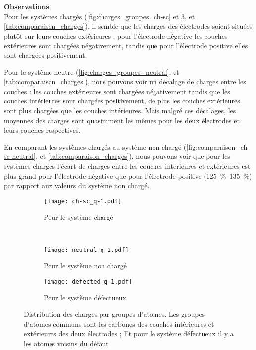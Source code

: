 \textbf{Observations}\\
Pour les systèmes chargés (\autoref{fig:charges_groupes_ch-sc} et \ref{fig:charges_groupes_defected}, et \autoref{tab:comparaison_charges}), il semble que les charges des électrodes soient situées plutôt sur leurs couches extérieures : pour l'électrode négative les couches extérieures sont chargées négativement, tandis que pour l'électrode positive elles sont chargées positivement.

Pour le système neutre (\autoref{fig:charges_groupes_neutral}, et \autoref{tab:comparaison_charges}), nous pouvons voir un décalage de charges entre les couches : les couches extérieures sont chargées négativement tandis que les couches intérieures sont chargées positivement, de plus les couches extérieures sont plus chargées que les couches intérieures. Mais malgré ces décalages, les moyennes des charges sont quasimment les mêmes pour les deux électrodes et leurs couches respectives.

En comparant les systèmes chargés au système non chargé (\autoref{fig:comparaison_ch-sc-neutral}, et \autoref{tab:comparaison_charges}), nous pouvons voir que pour les systèmes chargés l'écart de charges entre les couches intérieures et extérieures est plus grand pour l'électrode négative que pour l'électrode positive (\qtyrange[range-units = single]{125}{135}{\percent}) par rapport aux valeurs du système non chargé.

\begin{figure}[h!]
    \centering
    \begin{subfigure}{.49 \textwidth}
        \centering
        \texttt{[image: ch-sc\_q-1.pdf]}
        \caption{Pour le système chargé}
        \label{fig:charges_groupes_ch-sc}
    \end{subfigure}%
    ~
    \begin{subfigure}{.49 \textwidth}
        \centering
        \texttt{[image: neutral\_q-1.pdf]}
        \caption{Pour le système non chargé}
        \label{fig:charges_groupes_neutral}
    \end{subfigure}
    
    \begin{subfigure}{.49 \textwidth}
        \centering
        \texttt{[image: defected\_q-1.pdf]}
        \caption{Pour le système défectueux}
        \label{fig:charges_groupes_defected}
    \end{subfigure}

    \caption{Distribution des charges par groupes d'atomes. Les groupes d'atomes communs sont les carbones des couches intérieures et extérieures des deux électrodes ; Et pour le système défectueux il y a les atomes voisins du défaut}
    \label{fig:charges_groupes}
\end{figure}

